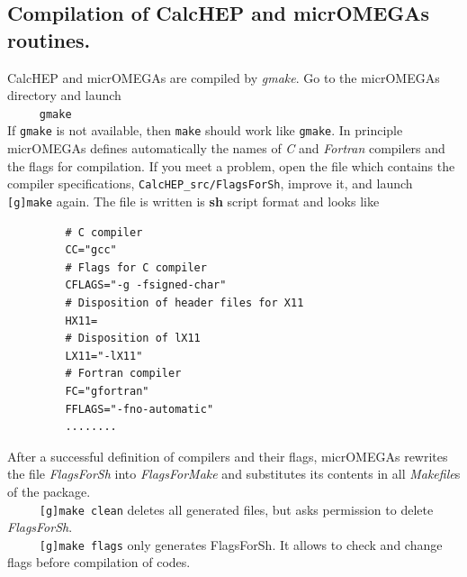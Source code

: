 \documentclass[12pt,a4paper]{article}
\begin{document}
\subsection{ Compilation of CalcHEP and micrOMEGAs routines.}
   CalcHEP and micrOMEGAs are compiled by {\it gmake}. Go to the micrOMEGAs directory
and launch\\
\verb|     gmake|\\
If {\tt gmake} is not available, then {\tt make} should work like {\tt gmake}.
In principle  micrOMEGAs  defines automatically the names of {\it C} and {\it
Fortran} compilers and the flags for
compilation. If you meet a  problem, open the file which contains the compiler specifications, 
\verb|CalcHEP_src/FlagsForSh|,
 improve it, and launch {\tt [g]make} 
again. The file  is written is {\bf sh} script format and looks like
\begin{verbatim}
         # C compiler
         CC="gcc"
         # Flags for C compiler
         CFLAGS="-g -fsigned-char"
         # Disposition of header files for X11
         HX11=
         # Disposition of lX11
         LX11="-lX11"
         # Fortran compiler
         FC="gfortran"
         FFLAGS="-fno-automatic"
         ........
\end{verbatim}
After a successful definition of compilers and their flags,   micrOMEGAs rewrites the file 
 {\it FlagsForSh} into {\it FlagsForMake} and substitutes its contents in all {\it
Makefile}s of the package.\\
\verb|     [g]make clean|    deletes all generated files, but asks permission to
delete {\it FlagsForSh}.\\
\verb|     [g]make flags|       only generates FlagsForSh. It allows to check and
change  flags before compilation of codes.


\end{document}
